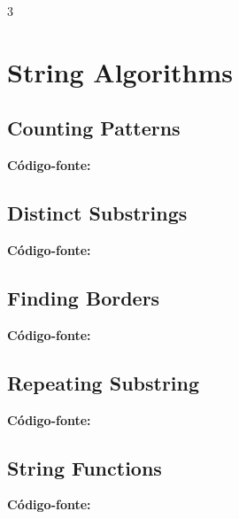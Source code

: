 \documentclass[8pt]{extarticle}
\begin{document}
\begin{multicols*}{3}

\section{String Algorithms}

\subsection{Counting Patterns}
\begin{caixaenunciado}

\end{caixaenunciado}
\vspace{0.3cm}
\noindent\textbf{Código-fonte:}


\subsection{Distinct Substrings}
\begin{caixaenunciado}

\end{caixaenunciado}
\vspace{0.3cm}
\noindent\textbf{Código-fonte:}


\subsection{Finding Borders}
\begin{caixaenunciado}

\end{caixaenunciado}
\vspace{0.3cm}
\noindent\textbf{Código-fonte:}


\subsection{Repeating Substring}
\begin{caixaenunciado}

\end{caixaenunciado}
\vspace{0.3cm}
\noindent\textbf{Código-fonte:}


\subsection{String Functions}
\begin{caixaenunciado}

\end{caixaenunciado}
\vspace{0.3cm}
\noindent\textbf{Código-fonte:}



\end{multicols*}
\end{document}
